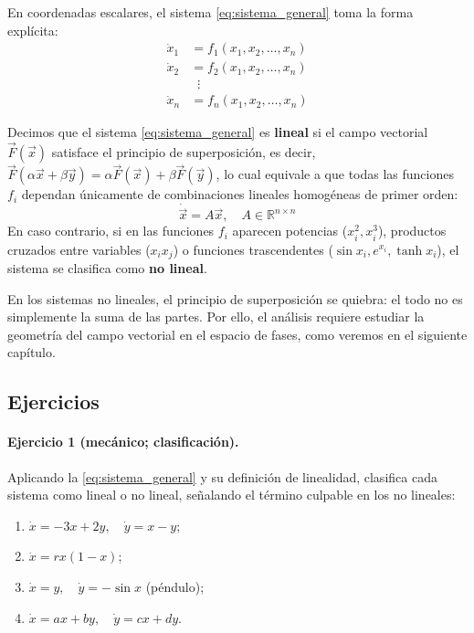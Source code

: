 En coordenadas escalares, el sistema \eqref{eq:sistema_general} toma la forma explícita:
\begin{equation}
\begin{aligned}
    \dot{x}_1 &= f_1(x_1, x_2, \dots, x_n) \\
    \dot{x}_2 &= f_2(x_1, x_2, \dots, x_n) \\
    &\;\;\vdots \\
    \dot{x}_n &= f_n(x_1, x_2, \dots, x_n)
\end{aligned}
\label{eq:sistema_escalar}
\end{equation}

\begin{definition}
    Decimos que el sistema \eqref{eq:sistema_general} es \textbf{lineal} si el campo vectorial $\vec{F}(\vec{x})$ satisface el principio de superposición, es decir, $\vec{F}(\alpha\vec{x} + \beta\vec{y}) = \alpha\vec{F}(\vec{x}) + \beta\vec{F}(\vec{y})$, lo cual equivale a que todas las funciones $f_i$ dependan únicamente de combinaciones lineales homogéneas de primer orden:
    \begin{equation}
        \dot{\vec{x}} = A \vec{x}, \quad A \in \mathbb{R}^{n \times n}
    \end{equation}
    En caso contrario, si en las funciones $f_i$ aparecen potencias ($x_i^2, x_i^3$), productos cruzados entre variables ($x_i x_j$) o funciones trascendentes ($\sin x_i, e^{x_i}, \tanh x_i$), el sistema se clasifica como \textbf{no lineal}.
\end{definition}

En los sistemas no lineales, el principio de superposición se quiebra: el todo no es simplemente la suma de las partes. Por ello, el análisis requiere estudiar la geometría del campo vectorial en el espacio de fases, como veremos en el siguiente capítulo.

\subsection{Ejercicios}

\paragraph{Ejercicio 1 (mecánico; clasificación).} Aplicando la \cref{eq:sistema_general} y su definición de linealidad, clasifica cada sistema como lineal o no lineal, señalando el término culpable en los no lineales:
\begin{enumerate}
    \item[(i)] $\dot{x} = -3x + 2y,\quad \dot{y} = x - y$;
    \item[(ii)] $\dot{x} = rx(1-x)$;
    \item[(iii)] $\dot{x} = y,\quad \dot{y} = -\sin x$ (péndulo);
    \item[(iv)] $\dot{x} = a x + b y,\quad \dot{y} = c x + d y$.
\end{enumerate}

